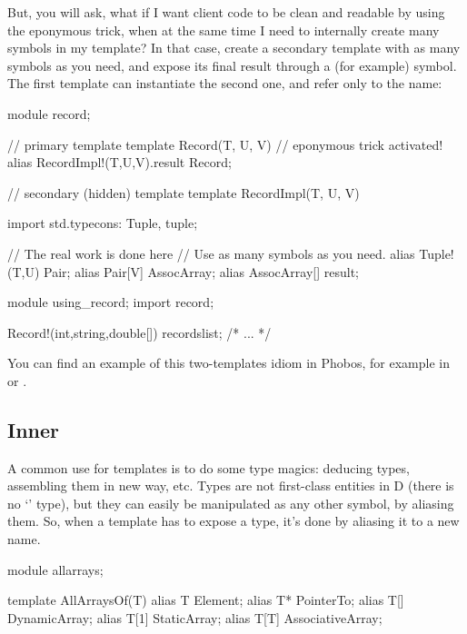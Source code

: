 But, you will ask, what if I want client code to be clean and readable by using the eponymous trick, when at the same time I need to internally create many symbols in my template? In that case, create a secondary template with as many symbols as you need, and expose its final result through a (for example)  symbol. The first template can instantiate the second one, and refer only to the  name:

\begin{dcode}
module record;

// primary template
template Record(T, U, V)
{
    // eponymous trick activated!     
    alias RecordImpl!(T,U,V).result Record;
}

// secondary (hidden) template
template RecordImpl(T, U, V)
{
    import std.typecons: Tuple, tuple;
    
    // The real work is done here 
    // Use as many symbols as you need.
    alias Tuple!(T,U) Pair;
    alias Pair[V] AssocArray;
    alias AssocArray[] result;
}
\end{dcode}

\begin{dcode}
module using_record;
import record;

Record!(int,string,double[]) recordslist;
/* ... */
\end{dcode}

You can find an example of this two-templates idiom in Phobos, for example in  or .

\subsection{\texorpdfstring{Inner }
                           {Inner alias}}
\label{inneralias}

A common use for templates is to do some type magics: deducing types, assembling them in new way, etc. Types are not first-class entities in D (there is no `' type), but they can easily be manipulated as any other symbol, by aliasing them. So, when a template has to expose a type, it's done by aliasing it to a new name.
\begin{dcode}
module allarrays;

template AllArraysOf(T)
{
    alias T    Element;
    alias T*   PointerTo;
    alias T[]  DynamicArray;
    alias T[1] StaticArray;
    alias T[T] AssociativeArray;
}
\end{dcode}

